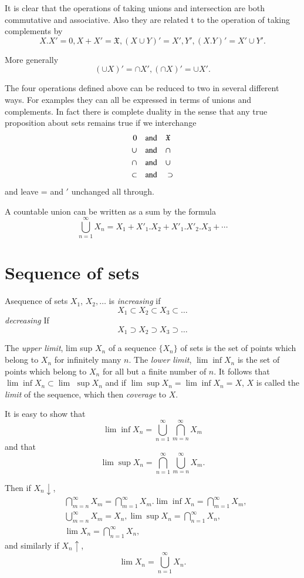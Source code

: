 It is clear that the operations of taking unions and intersection are
both commutative and associative. Also they are related t to the
operation of taking complements by  
$$
X.X'=0,X+X'=\mathfrak{X},(X \cup Y)'=X',Y',(X.Y)'=X'\cup
  Y'.
$$

More generally
$$
(\cup X)'=\cap X',(\cap X)'=\cup X'.
$$

The four operations defined above can be reduced to two in several
different ways. For examples they can all be expressed  in terms  of
unions  and complements. In fact there is complete duality in the
sense that any true proposition about sets remains true if we
interchange  
\begin{align*}
  0 & \quad {\rm and}  \quad \mathfrak{X}\\
  \cup &  \quad{\rm and}  \quad \cap\\
  \cap &  \quad{\rm and}  \quad \cup\\
  \subset &  \quad{\rm and}  \quad \supset
\end{align*}
and leave = and $'$ unchanged all through.

A countable union can be written as a sum by the formula
$$
\bigcup^{\infty}_{n=1}
  X_n=X_1+X'_1. X_2+X'_1.X'_2.X_3 +\cdots
$$ 

\section{Sequence of sets}\label{chap1:sec2} %

A\pageoriginale sequence of sets $X_1$, $X_2,\dots $ is {\em increasing} if
$$
X_1\subset X_2 \subset X_3 \subset \ldots
$$
{\em decreasing} If
$$
X_1\supset X_2\supset X_3\supset\ldots 
$$

The {\em upper limit}, lim  sup $X_n$ of a sequence $\{X_n\}$ of sets is the
set of points which belong to $X_n$ for infinitely many $n$. 
The {\em lower limit},
$\lim \inf X_n$ is the set of points which belong to $X_n$ for all but a
finite number of $n$. It follows that $\lim \inf X_n\subset \lim$  $\sup X_n$
and if $\lim \sup X_n= \lim \inf X_n=X$, $X$ is called the {\em limit} of the
sequence, which then {\em coverage} to $X$.  

It is easy to show that
$$
\lim\inf X_n =\bigcup^{\infty}_{n=1}\bigcap^{\infty}_{m=n} X_m
$$
and that 
$$
\lim\sup X_n = \bigcap^{\infty}_{n=1}\bigcup^{\infty}_{m=n} X_m.
$$

Then if  $X_n \downarrow$,
\begin{align*}
  & \bigcap^{\infty}_{m=n} X_{m}= \bigcap^{\infty}_{m=1} X_m. \lim
  \inf X_n  = \bigcap^{\infty}_{m=1} X_m,\\ 
  &\bigcup^{\infty}_{m=n} X_m = X_n,  \lim\sup X_n =\bigcap^{\infty}_{n=1} X_n,\\
  &\lim X_n = \bigcap^{\infty}_{n=1} X_n,
\end{align*}
and similarly if $X_n \uparrow$,
$$
\lim X_n=\bigcup^{\infty}_{n=1} X_n.
$$

